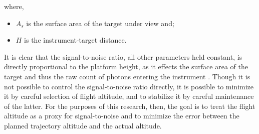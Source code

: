 where, 

\begin{itemize}
\item $A_s$ is the surface area of the target under view and;
\item $H$ is the instrument-target distance.
\end{itemize}

It is clear that the signal-to-noise ratio, all other parameters held constant, is directly proportional to the platform height, as it effects the surface area of the target and thus the raw count of photons entering the instrument \cite{Gupta2018}. Though it is not possible to control the signal-to-noise ratio directly, it is possible to minimize it by careful selection of flight altitude, and to stabilize it by careful maintenance of the latter. For the purposes of this research, then, the goal is to treat the flight altitude as a proxy for signal-to-noise and to minimize the error between the planned trajectory altitude and the actual altitude.






